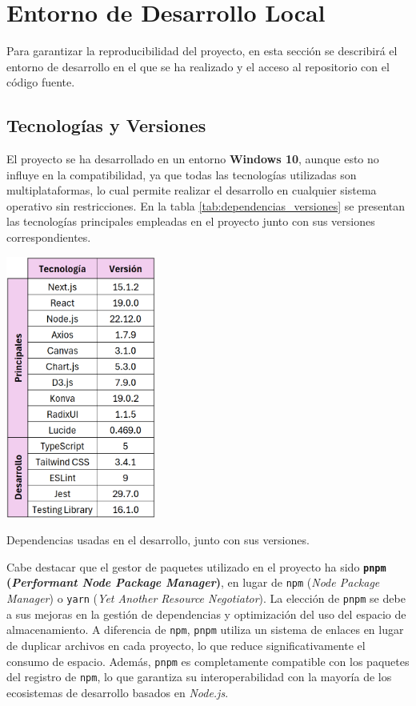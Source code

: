 \section{Entorno de Desarrollo Local}

Para garantizar la reproducibilidad del proyecto, en esta sección se describirá el entorno de desarrollo en el que se ha realizado y el acceso al repositorio con el código fuente.

\subsection{Tecnologías y Versiones}

El proyecto se ha desarrollado en un entorno \textbf{Windows 10}, aunque esto no influye en la compatibilidad, ya que todas las tecnologías utilizadas son multiplataformas, lo cual permite realizar el desarrollo en cualquier sistema operativo sin restricciones. En la tabla \ref{tab:dependencias_versiones} se presentan las tecnologías principales empleadas en el proyecto junto con sus versiones correspondientes.

\begin{table}[htbp]
    \centering
    \includegraphics[width=0.37\textwidth]{figures/dependencias_versiones.png}
    \captionsetup{skip=5pt}
    \caption{Dependencias usadas en el desarrollo, junto con sus versiones.}
    \label{tab:dependencias_versiones}
\end{table}

Cabe destacar que el gestor de paquetes utilizado en el proyecto ha sido \textbf{\texttt{pnpm} (\textit{Performant Node Package Manager})}, en lugar de \texttt{npm} (\textit{Node Package Manager}) o \texttt{yarn} (\textit{Yet Another Resource Negotiator}). La elección de \texttt{pnpm} se debe a sus mejoras en la gestión de dependencias y optimización del uso del espacio de almacenamiento. A diferencia de \texttt{npm}, \texttt{pnpm} utiliza un sistema de enlaces en lugar de duplicar archivos en cada proyecto, lo que reduce significativamente el consumo de espacio. Además, \texttt{pnpm} es completamente compatible con los paquetes del registro de \texttt{npm}, lo que garantiza su interoperabilidad con la mayoría de los ecosistemas de desarrollo basados en \textit{Node.js}.

